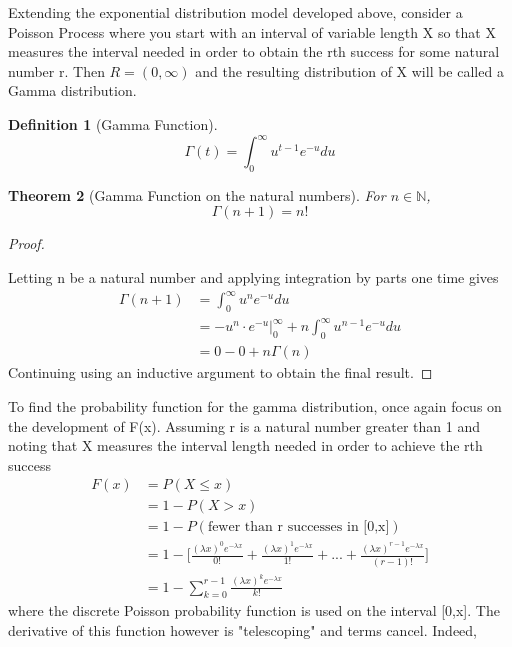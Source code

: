 \documentclass[10pt,]{book}
\theoremstyle{plain}
\newtheorem{theorem}{Theorem}[section]
\theoremstyle{definition}
\newtheorem{definition}[theorem]{Definition}
\theoremstyle{definition}
\theoremstyle{definition}
\numberwithin{equation}{section}
\newcommand{\gt}{ > }
\begin{document}
Extending the exponential distribution model developed above, consider a Poisson Process where you start with an interval of variable length X so that X measures the interval needed in order to obtain the rth success for some natural number r. Then \(R = (0,\infty)\) and the resulting distribution of X will be called a Gamma distribution.
%
\begin{definition}[{Gamma Function}]\label{definition-30}
\begin{equation*}\Gamma(t) = \int_0^{\infty} u^{t-1} e^{-u} du\end{equation*}\end{definition}
\begin{theorem}[{Gamma Function on the natural numbers}]\label{theorem-52}
For \(n \in \mathbb{N}\),
\begin{equation*}\Gamma(n+1) = n!\end{equation*}
%
\end{theorem}
\begin{proof}\hypertarget{proof-51}{}

Letting n be a natural number and applying integration by parts one time gives
\begin{align*}
\Gamma(n+1) & = \int_0^{\infty} u^n e^{-u} du\\
 & = -u^n \cdot e^{-u} \big |_0^{\infty} + n \int_0^{\infty} u^{n-1} e^{-u} du \\
 & = 0 - 0 + n \Gamma(n)
\end{align*}
Continuing using an inductive argument to obtain the final result.
%
\end{proof}
\par
To find the probability function for the gamma distribution, once again focus on the development of F(x). Assuming r is a natural number greater than 1 and noting that X measures the interval length needed in order to achieve the rth success
\begin{align*}
F(x) & = P(X \le x)\\
 & = 1 - P(X \gt x)\\
 & = 1 - P(\text{fewer than r successes in [0,x]})\\
 & = 1 - \big [ \frac{(\lambda x)^0 e^{-\lambda x}}{0!} + \frac{(\lambda x)^1 e^{-\lambda x}}{1!} + ... + \frac{(\lambda x)^{r-1} e^{-\lambda x}}{(r-1)!} \big ]\\
 & = 1 - \sum_{k=0}^{r-1} \frac{(\lambda x)^k e^{-\lambda x}}{k!} 
\end{align*}
where the discrete Poisson probability function is used on the interval [0,x]. The derivative of this function however is "telescoping" and terms cancel. Indeed,
\end{document}
